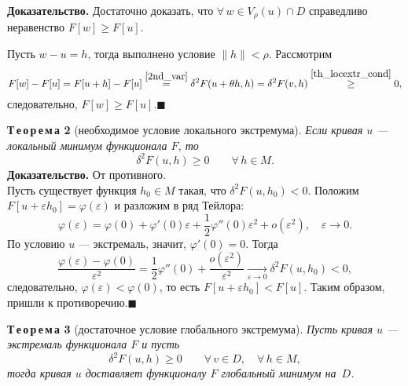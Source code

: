 \documentclass[12pt,a5paper]{book}
\begin{document}
	\vspace*{0.5em}
	\noindent \textbf{Доказательство.} Достаточно доказать, что $\forall\,w \in V_\rho(u) \cap D$ справедливо неравенство $F[w] \geq F[u]$.
	
	Пусть $w - u = h$, тогда выполнено условие $\|h\| < \rho$. Рассмотрим
	\begin{equation*}
		F[w] - F[u] = F[u + h] - F[u] \stackrel{\eqref{2nd_var}}{=} \delta^2F(u + \theta h,h) = \delta^2F(v,h) \stackrel{\eqref{th_locextr_cond}}{\geq} 0,
	\end{equation*}
	следовательно, $F[w] \geq F[u]$.$\blacksquare$
	
	\vspace*{1em}
	\noindent \textbf{Т\,е\,о\,р\,е\,м\,а 2} (необходимое условие локального экстремума). \textit{Если кривая $u$ --- локальный минимум функционала $F$, то}
	\begin{equation*}
		\delta^2F(u,h) \geq 0 \qquad \forall\,h \in M.
	\end{equation*}
	\textbf{Доказательство.} От противного.\\
	Пусть существует функция $h_0 \in M$ такая, что $\delta^2F(u,h_0) < 0$. Положим $F[u + \varepsilon h_0] = \varphi(\varepsilon)$ и разложим в ряд Тейлора:
	\begin{equation*}
		\varphi(\varepsilon) = \varphi(0) + \varphi'(0)\varepsilon + \frac{1}{2}\varphi''(0)\varepsilon^2 + o(\varepsilon^2), \quad \varepsilon \rightarrow 0.
	\end{equation*}
	По условию $u$ --- экстремаль, значит, $\varphi'(0) = 0$. Тогда
	\begin{equation*}
		\frac{\varphi(\varepsilon) - \varphi(0)}{\varepsilon^2} = \frac{1}{2}\varphi''(0) + \frac{o(\varepsilon^2)}{\varepsilon^2} \xrightarrow[\varepsilon \rightarrow 0]{} \delta^2F(u, h_0) < 0,
	\end{equation*}
	следовательно, $\varphi(\varepsilon) < \varphi(0)$, то есть $F[u + \varepsilon h_0] < F[u]$. Таким образом, пришли к противоречию.$\blacksquare$
	
	\vspace*{1em}
	\noindent \textbf{Т\,е\,о\,р\,е\,м\,а 3} (достаточное условие глобального экстремума). \textit{Пусть кривая $u$ --- экстремаль функционала $F$ и пусть}
	\begin{equation}\label{th_extr_cond}
		 \delta^2F(u,h) \geq 0 \qquad \forall\,v \in D, \quad \forall\,h \in M,
	\end{equation}
	\textit{тогда кривая $u$ доставляет функционалу $F$ глобальный минимум на~$D$.}
	
\end{document}
